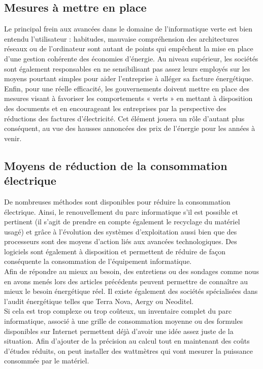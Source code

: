 \documentclass[a4paper,11pt,french]{article}
\begin{document}
\subsection{Mesures à mettre en place}
Le principal frein aux avancées dans le domaine de l’informatique verte est bien entendu l’utilisateur : habitudes, mauvaise compréhension des architectures réseaux ou de l’ordinateur sont autant de points qui empêchent la mise en place d’une gestion cohérente des économies d’énergie. Au niveau supérieur, les sociétés sont également responsables en ne sensibilisant pas assez leurs employés sur les moyens pourtant simples pour aider l’entreprise à alléger sa facture énergétique. Enfin, pour une réelle efficacité, les gouvernements doivent mettre en place des mesures visant à favoriser les comportements « verts » en mettant à disposition des documents et en encourageant les entreprises par la perspective des réductions des factures d’électricité. Cet élément jouera un rôle d’autant plus conséquent, au vue des hausses annoncées des prix de l’énergie pour les années à venir.\\

\subsection{Moyens de réduction de la consommation électrique}
De nombreuses méthodes sont disponibles pour réduire la consommation électrique. Ainsi, le renouvellement du parc informatique s’il est possible et pertinent (il s’agit de prendre en compte également le recyclage du matériel usagé) et grâce à l’évolution des systèmes d’exploitation aussi bien que des processeurs sont des moyens d’action liés aux avancées technologiques. Des logiciels sont également à disposition et permettent de réduire de façon conséquente la consommation de l’équipement informatique.\\

Afin de répondre au mieux au besoin, des entretiens ou des sondages comme nous en avons menés lors des articles précédents peuvent permettre de connaître au mieux le besoin énergétique réel. Il existe également des sociétés spécialisées dans l’audit énergétique telles que Terra Nova, Aergy ou Neoditel.\\

Si cela est trop complexe ou trop coûteux, un inventaire complet du parc informatique, associé à une grille de consommation moyenne ou des formules disponibles sur Internet permettent déjà d’avoir une idée assez juste de la situation. Afin d’ajouter de la précision au calcul tout en maintenant des coûts d’études réduits, on peut installer des wattmètres qui vont mesurer la puissance consommée par le matériel.\\
\end{document}
